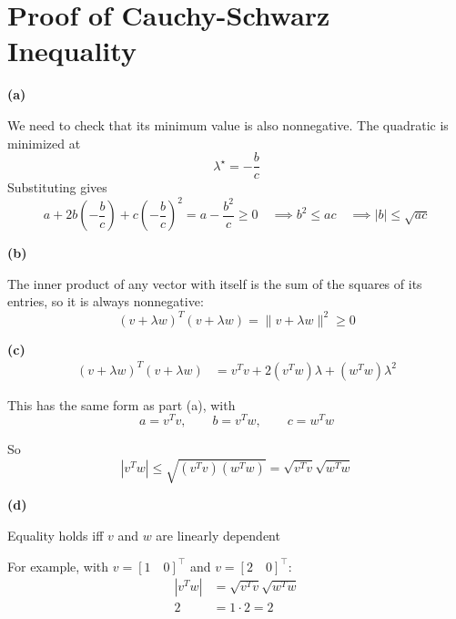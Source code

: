 \section{Proof of Cauchy-Schwarz Inequality}

\textbf{(a)}

We need to check that its minimum value is also nonnegative.
The quadratic is minimized at
\[
    \lambda^\star = -\frac{b}{c}
\]
Substituting gives
\[
    a + 2b\left(-\frac{b}{c}\right)
        + c\left(-\frac{b}{c}\right)^2
    =
    a - \frac{b^2}{c} \geq 0 \quad \implies b^2 \leq ac \quad \implies |b| \leq \sqrt{ac}
\]

\textbf{(b)}

The inner product of any vector with itself is the sum of the squares of its entries, so it is
always nonnegative:
\[
    (v+\lambda w)^T(v+\lambda w)
    =
    \|v+\lambda w\|^2
    \geq 0
\]

\textbf{(c)}
\begin{align*}
    (v+\lambda w)^T(v+\lambda w)
    &=
    v^T v + 2(v^T w)\lambda + (w^T w)\lambda^2
\end{align*}

This has the same form as part (a), with
\[
    a = v^T v,
    \qquad
    b = v^T w,
    \qquad
    c = w^T w
\]

So
\[
    |v^T w|
    \leq
    \sqrt{(v^T v)(w^T w)}
    =
    \sqrt{v^T v}\sqrt{w^T w}
\]

\textbf{(d)}

Equality holds iff \(v\) and \(w\) are linearly dependent

For example, with $v = [1 \quad 0]^\top$ and $v = [2 \quad 0]^\top$:
\begin{align*}
    |v^T w|
    &=
    \sqrt{v^T v}\sqrt{w^T w} \\
    2 &= 1 \cdot 2 = 2
\end{align*}

